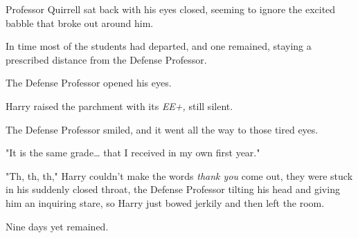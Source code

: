 Professor Quirrell sat back with his eyes closed, seeming to ignore the excited
babble that broke out around him.

In time most of the students had departed, and one remained, staying a
prescribed distance from the Defense Professor.

The Defense Professor opened his eyes.

Harry raised the parchment with its \emph{EE+,} still silent.

The Defense Professor smiled, and it went all the way to those tired eyes.

"It is the same grade{\ldots} that I received in my own first year."

"Th, th, th," Harry couldn't make the words \emph{thank you} come out, they
were stuck in his suddenly closed throat, the Defense Professor tilting his
head and giving him an inquiring stare, so Harry just bowed jerkily and then
left the room.

Nine days yet remained.

